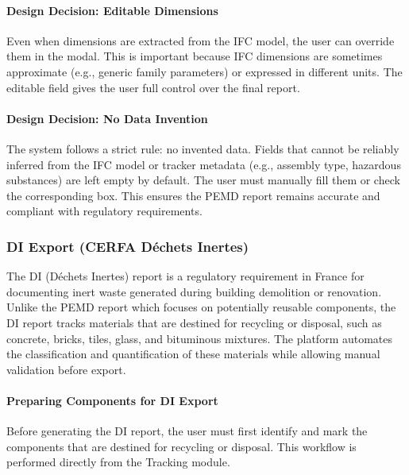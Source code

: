 \documentclass[11pt,a4paper]{article}
\begin{document}
\paragraph{Design Decision: Editable Dimensions}

Even when dimensions are extracted from the IFC model, the user can override them in the modal. This is important because IFC dimensions are sometimes approximate (e.g., generic family parameters) or expressed in different units. The editable field gives the user full control over the final report.

\paragraph{Design Decision: No Data Invention}

The system follows a strict rule: no invented data. Fields that cannot be reliably inferred from the IFC model or tracker metadata (e.g., assembly type, hazardous substances) are left empty by default. The user must manually fill them or check the corresponding box. This ensures the PEMD report remains accurate and compliant with regulatory requirements.

\subsubsection{DI Export (CERFA Déchets Inertes)}

The DI (Déchets Inertes) report is a regulatory requirement in France for documenting inert waste generated during building demolition or renovation. Unlike the PEMD report which focuses on potentially reusable components, the DI report tracks materials that are destined for recycling or disposal, such as concrete, bricks, tiles, glass, and bituminous mixtures. The platform automates the classification and quantification of these materials while allowing manual validation before export.

\paragraph{Preparing Components for DI Export}

Before generating the DI report, the user must first identify and mark the components that are destined for recycling or disposal. This workflow is performed directly from the Tracking module.
\end{document}
